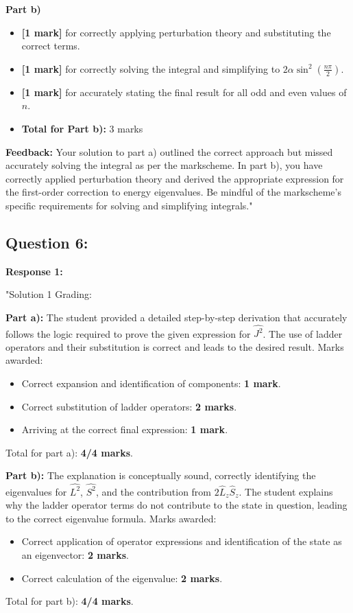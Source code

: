 \documentclass[a4paper,11pt]{article}
\begin{document}
\textbf{Part b)}
\begin{itemize}
    \item \textbf{[1 mark]} for correctly applying perturbation theory and substituting the correct terms.
    \item \textbf{[1 mark]} for correctly solving the integral and simplifying to \(2 \alpha \sin^{2}\left(\frac{n \pi}{2} \right)\).
    \item \textbf{[1 mark]} for accurately stating the final result for all odd and even values of \( n \).
    \item \textbf{Total for Part b):} 3 marks
\end{itemize}

\textbf{Feedback:} Your solution to part a) outlined the correct approach but missed accurately solving the integral as per the markscheme. In part b), you have correctly applied perturbation theory and derived the appropriate expression for the first-order correction to energy eigenvalues. Be mindful of the markscheme's specific requirements for solving and simplifying integrals."

\subsection*{Question 6:}

\textbf{Response 1:}

"Solution 1 Grading:

\textbf{Part a):} The student provided a detailed step-by-step derivation that accurately follows the logic required to prove the given expression for \(\hat{J^{2}}\). The use of ladder operators and their substitution is correct and leads to the desired result. Marks awarded:
\begin{itemize}
    \item Correct expansion and identification of components: \textbf{1 mark}.
    \item Correct substitution of ladder operators: \textbf{2 marks}.
    \item Arriving at the correct final expression: \textbf{1 mark}.
\end{itemize}
Total for part a): \textbf{4/4 marks}.

\textbf{Part b):} The explanation is conceptually sound, correctly identifying the eigenvalues for \(\hat{L^{2}}\), \(\hat{S^{2}}\), and the contribution from \(2\hat{L}_{z}\hat{S}_{z}\). The student explains why the ladder operator terms do not contribute to the state in question, leading to the correct eigenvalue formula. Marks awarded:
\begin{itemize}
    \item Correct application of operator expressions and identification of the state as an eigenvector: \textbf{2 marks}.
    \item Correct calculation of the eigenvalue: \textbf{2 marks}.
\end{itemize}
Total for part b): \textbf{4/4 marks}.
\end{document}
